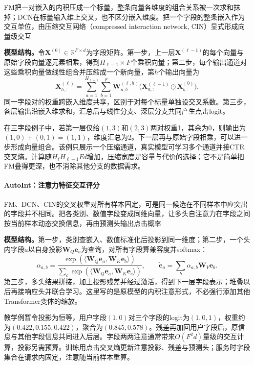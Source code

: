 FM把一对嵌入的内积压成一个标量，整条向量各维度的组合关系被一次求和抹掉；DCN在标量输入维上交叉，也不区分嵌入维度。把一个字段的整条嵌入作为交互单位，由压缩交互网络（compressed interaction network, CIN）显式形成向量级交互

\textbf{模型结构。}令$\bm X^{(0)}\in\mathbb R^{F\times d}$为字段矩阵。第一步，上一层$\bm X^{(\ell-1)}$的每个向量与原始字段向量逐元素相乘，得到$H_{\ell-1}\times F$个乘积向量；第二步，每个输出通道对这些乘积向量做线性组合并压缩成一个新向量，第$h$个输出向量为
\begin{equation}
 \bm X^{(\ell)}_{h,:}
 =\sum_{a=1}^{H_{\ell-1}}\sum_{b=1}^{F}
   \bm W^{(\ell,h)}_{a,b}
   \bigl(\bm X^{(\ell-1)}_{a,:}\odot\bm X^{(0)}_{b,:}\bigr).
 \label{eq:rs-cin}
\end{equation}
同一字段对的权重跨嵌入维度共享，区别于对每个标量单独设交叉系数。第三步，各层输出沿嵌入维求和，汇总后与线性分支、深层分支共同产生点击logit。

在三字段例子中，若第一层仅给$(1,3)$和$(2,3)$两对权重1，其余为0，则输出为$(1,0)+(0,1)=(1,1)$，维度汇总为2。下一层再与原始字段相乘，可以进一步形成向量组合。该例只展示一个压缩通道，真实模型可学习多个通道并接CTR交叉熵。计算随$H_\ell H_{\ell-1}Fd$增加，压缩宽度是容量与代价的选择；它不是简单把FM叠得更深，也不消除其他分支的数据需求。

\paragraph{AutoInt：注意力特征交互评分}
\label{sec:rs-autoint}

FM、DCN、CIN的交叉权重对所有样本固定，可是同一候选在不同样本中应突出的字段并不相同。把各类别、数值字段变成同维向量，让多头自注意力在字段之间按当前样本动态交换信息，再由预测头输出点击概率

\textbf{模型结构。}第一步，类别查嵌入、数值标准化后投影到同一维度；第二步，一个头内字段$a$以自身投影$\bm W_Q\bm e_a$为查询，对所有字段算兼容度并softmax：
\[
 \alpha_{a,b}=
 \frac{\exp(\langle\bm W_Q\bm e_a,\bm W_K\bm e_b\rangle)}
      {\sum_c\exp(\langle\bm W_Q\bm e_a,\bm W_K\bm e_c\rangle)},
 \qquad
 \widetilde{\bm e}_a=\sum_b\alpha_{a,b}\bm W_V\bm e_b.
\]
第三步，多头结果拼接，加上投影残差并经过激活，得到下一层字段表示；堆叠以后再接响应头并联合学习。这里写的是原模型的内积注意形式，不必强行添加其他Transformer变体的缩放。

教学例暂令投影为恒等，用户字段$(1,0)$对三个字段的logit为$(1,0,1)$，权重约为$(0.422,0.155,0.422)$，聚合为$(0.845,0.578)$。残差再加回用户字段后，原信息与其他字段信息共同进入后层。字段两两注意通常带来$O(F^2d)$量级的交互计算，投影另需预算。训练用点击交叉熵更新注意投影、残差与预测头；服务时字段集合在请求内固定，注意随当前样本重算。

